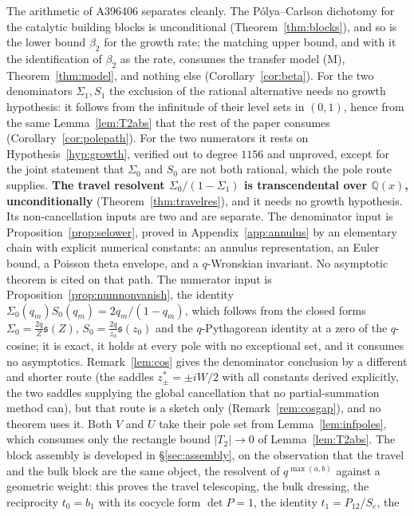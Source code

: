 \documentclass[11pt]{article}
\theoremstyle{plain}
\theoremstyle{definition}
\theoremstyle{remark}
\newcommand{\Q}{\mathbb{Q}}
\begin{document}
The arithmetic of A396406 separates cleanly. The P\'olya--Carlson dichotomy for the catalytic
building blocks is unconditional (Theorem~\ref{thm:blocks}), and so is the lower bound $\beta_2$
for the growth rate; the matching upper bound, and with it the identification of $\beta_2$ as the
rate, consumes the transfer model \textup{(M)}, Theorem~\ref{thm:model}, and nothing else
(Corollary~\ref{cor:beta}). For the two denominators $\Sigma_1,S_1$ the exclusion of the rational
alternative needs no growth hypothesis: it follows from the infinitude of their level sets in
$(0,1)$, hence from the same Lemma~\ref{lem:T2abs} that the rest of the paper consumes
(Corollary~\ref{cor:polepath}). For the two numerators it rests on Hypothesis~\ref{hyp:growth},
verified out to degree $1156$ and unproved, except for the joint statement that $\Sigma_0$ and
$S_0$ are not both rational, which the pole route supplies. \textbf{The travel resolvent
$\Sigma_0/(1-\Sigma_1)$ is transcendental over $\Q(x)$, unconditionally}
(Theorem~\ref{thm:travelres}), and it needs no growth hypothesis. Its non-cancellation inputs are
two and are separate. The denominator input is Proposition~\ref{prop:selower},
proved in Appendix~\ref{app:annulus} by an elementary chain with explicit numerical constants: an
annulus representation, an Euler bound, a Poisson theta envelope, and a $q$-Wronskian invariant. No
asymptotic theorem is cited on that path. The numerator input is
Proposition~\ref{prop:numnonvanish}, the identity $\Sigma_0(q_m)S_0(q_m)=2q_m/(1-q_m)$, which
follows from the closed forms $\Sigma_0=\tfrac{2q}Z\mathfrak s(Z)$, $S_0=\tfrac{2q}{z_0}\mathfrak
s(z_0)$ and the $q$-Pythagorean identity at a zero of the $q$-cosine; it is exact, it holds at
every pole with no exceptional set, and it consumes no asymptotics. Remark~\ref{lem:cos} gives the
denominator conclusion by a
different and shorter route (the saddles $z^\ast_\pm=\pm iW/2$ with all constants derived
explicitly, the two saddles supplying the global cancellation that no partial-summation method can), but that route is a sketch only (Remark~\ref{rem:cosgap}), and no theorem uses it. Both $V$ and
$U$ take their pole set from Lemma~\ref{lem:infpoles}, which consumes only the rectangle bound
$|T_2|\to0$ of Lemma~\ref{lem:T2abs}. The block assembly is developed in \S\ref{sec:assembly}, on
the observation that the travel and the bulk block are the same object, the resolvent of
$q^{\max(a,b)}$ against a geometric weight: this proves the travel telescoping, the bulk dressing,
the reciprocity $t_0=b_1$ with its cocycle form $\det P=1$, the identity $t_1=P_{12}/S_e$, the
\end{document}
